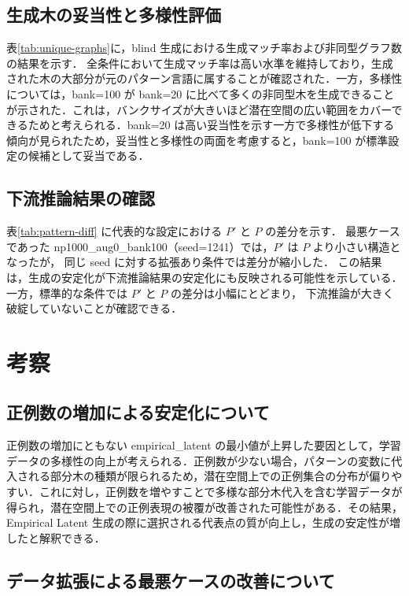 \documentclass[submit,techrep,noauthor]{ipsj}
\begin{document}
\subsection{生成木の妥当性と多様性評価}

表\ref{tab:unique-graphs}に，blind 生成における生成マッチ率および非同型グラフ数の結果を示す．
全条件において生成マッチ率は高い水準を維持しており，生成された木の大部分が元のパターン言語に属することが確認された．一方，多様性については，bank=100 が bank=20 に比べて多くの非同型木を生成できることが示された．これは，バンクサイズが大きいほど潜在空間の広い範囲をカバーできるためと考えられる．bank=20 は高い妥当性を示す一方で多様性が低下する傾向が見られたため，妥当性と多様性の両面を考慮すると，bank=100 が標準設定の候補として妥当である．

\subsection{下流推論結果の確認}

表\ref{tab:pattern-diff} に代表的な設定における $P'$ と $P$ の差分を示す．
最悪ケースであった np1000\_aug0\_bank100（seed=1241）では，$P'$ は $P$ より小さい構造となったが，
同じ seed に対する拡張あり条件では差分が縮小した．
この結果は，生成の安定化が下流推論結果の安定化にも反映される可能性を示している．
一方，標準的な条件では $P'$ と $P$ の差分は小幅にとどまり，
下流推論が大きく破綻していないことが確認できる．

\section{考察}

\subsection{正例数の増加による安定化について}

正例数の増加にともない empirical\_latent の最小値が上昇した要因として，学習データの多様性の向上が考えられる．正例数が少ない場合，パターンの変数に代入される部分木の種類が限られるため，潜在空間上での正例集合の分布が偏りやすい．これに対し，正例数を増やすことで多様な部分木代入を含む学習データが得られ，潜在空間上での正例表現の被覆が改善された可能性がある．その結果，Empirical Latent 生成の際に選択される代表点の質が向上し，生成の安定性が増したと解釈できる．

\subsection{データ拡張による最悪ケースの改善について}
\end{document}
